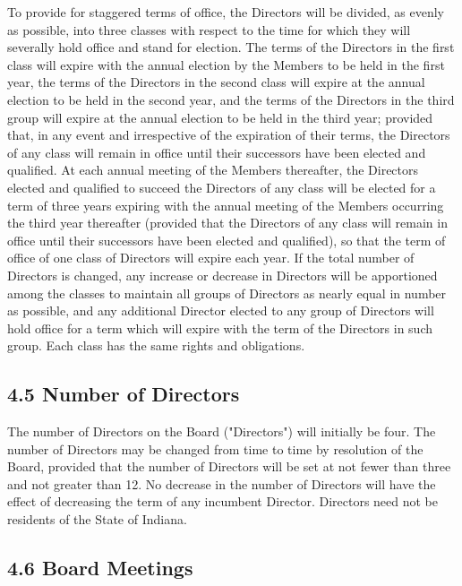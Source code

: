 \documentclass[
]{book}
\begin{document}
To provide for staggered terms of office, the Directors will be divided, as evenly as possible, into three classes with respect to the time for which they will severally hold office and stand for election. The terms of the Directors in the first class will expire with the annual election by the Members to be held in the first year, the terms of the Directors in the second class will expire at the annual election to be held in the second year, and the terms of the Directors in the third group will expire at the annual election to be held in the third year; provided that, in any event and irrespective of the expiration of their terms, the Directors of any class will remain in office until their successors have been elected and qualified. At each annual meeting of the Members thereafter, the Directors elected and qualified to succeed the Directors of any class will be elected for a term of three years expiring with the annual meeting of the Members occurring the third year thereafter (provided that the Directors of any class will remain in office until their successors have been elected and qualified), so that the term of office of one class of Directors will expire each year. If the total number of Directors is changed, any increase or decrease in Directors will be apportioned among the classes to maintain all groups of Directors as nearly equal in number as possible, and any additional Director elected to any group of Directors will hold office for a term which will expire with the term of the Directors in such group. Each class has the same rights and obligations.

\subsection*{4.5 Number of Directors}\label{number-of-directors}

The number of Directors on the Board ("Directors") will initially be four. The number of Directors may be changed from time to time by resolution of the Board, provided that the number of Directors will be set at not fewer than three and not greater than 12. No decrease in the number of Directors will have the effect of decreasing the term of any incumbent Director. Directors need not be residents of the State of Indiana.

\subsection*{4.6 Board Meetings}\label{board-meetings}
\end{document}
